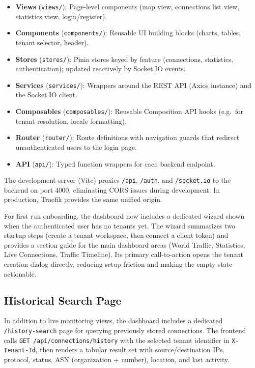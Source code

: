 \documentclass[12pt]{report}
\begin{document}
\begin{itemize}
    \item \textbf{Views} (\texttt{views/}): Page-level components (map view, connections
          list view, statistics view, login/register).
    \item \textbf{Components} (\texttt{components/}): Reusable UI building blocks (charts,
          tables, tenant selector, header).
    \item \textbf{Stores} (\texttt{stores/}): Pinia stores keyed by feature
          (connections, statistics, authentication); updated reactively by Socket.IO events.
    \item \textbf{Services} (\texttt{services/}): Wrappers around the REST API (Axios
          instance) and the Socket.IO client.
    \item \textbf{Composables} (\texttt{composables/}): Reusable Composition API hooks
          (e.g.\ for tenant resolution, locale formatting).
    \item \textbf{Router} (\texttt{router/}): Route definitions with navigation guards that
          redirect unauthenticated users to the login page.
    \item \textbf{API} (\texttt{api/}): Typed function wrappers for each backend endpoint.
\end{itemize}

The development server (Vite) proxies \texttt{/api}, \texttt{/auth}, and
\texttt{/socket.io} to the backend on port 4000, eliminating CORS issues during development.
In production, Traefik provides the same unified origin.

For first run onboarding, the dashboard now includes a dedicated wizard shown when the
authenticated user has no tenants yet. The wizard summarizes two startup steps (create a
tenant workspace, then connect a client token) and provides a section guide for the main
dashboard areas (World Traffic, Statistics, Live Connections, Traffic Timeline). Its primary
call-to-action opens the tenant creation dialog directly, reducing setup friction and making
the empty state actionable.

\subsection{Historical Search Page}

In addition to live monitoring views, the dashboard includes a dedicated
\texttt{/history-search} page for querying previously stored connections.
The frontend calls \texttt{GET /api/connections/history} with the selected tenant
identifier in \texttt{X-Tenant-Id}, then renders a tabular result set with
source/destination IPs, protocol, status, ASN (organization + number), location,
and last activity.
\end{document}
